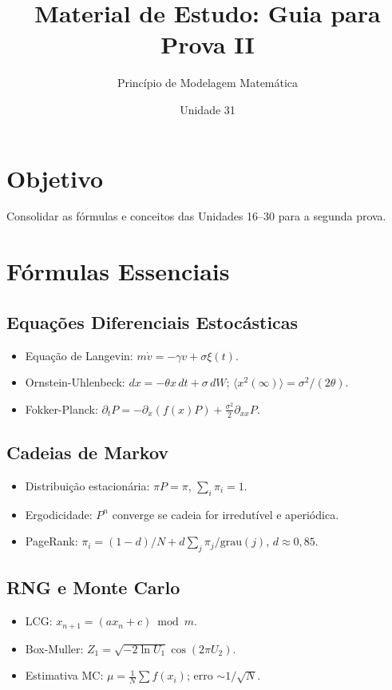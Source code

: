 \documentclass[12pt,a4paper]{article}
\title{Material de Estudo: Guia para Prova II}
\author{Princ\'ipio de Modelagem Matem\'atica}
\date{Unidade 31}
\begin{document}
\maketitle

\section*{Objetivo}
Consolidar as f\'ormulas e conceitos das Unidades 16--30 para a segunda prova.

\section*{F\'ormulas Essenciais}

\subsection*{Equa\c{c}\~oes Diferenciais Estoc\'asticas}
\begin{itemize}
  \item Equa\c{c}\~ao de Langevin: $m\dot{v} = -\gamma v + \sigma\xi(t)$.
  \item Ornstein-Uhlenbeck: $dx = -\theta x\,dt + \sigma\,dW$; $\langle x^2(\infty)\rangle = \sigma^2/(2\theta)$.
  \item Fokker-Planck: $\partial_t P = -\partial_x(f(x)P) + \frac{\sigma^2}{2}\partial_{xx}P$.
\end{itemize}

\subsection*{Cadeias de Markov}
\begin{itemize}
  \item Distribui\c{c}\~ao estacion\'aria: $\pi P = \pi$, $\sum_i\pi_i = 1$.
  \item Ergodicidade: $P^n$ converge se cadeia for irredut\'ivel e aperi\'odica.
  \item PageRank: $\pi_i = (1-d)/N + d\sum_j\pi_j/\text{grau}(j)$, $d\approx0{,}85$.
\end{itemize}

\subsection*{RNG e Monte Carlo}
\begin{itemize}
  \item LCG: $x_{n+1} = (ax_n + c)\bmod m$.
  \item Box-Muller: $Z_1 = \sqrt{-2\ln U_1}\cos(2\pi U_2)$.
  \item Estimativa MC: $\mu = \frac{1}{N}\sum f(x_i)$; erro $\sim 1/\sqrt{N}$.
\end{itemize}
\end{document}
